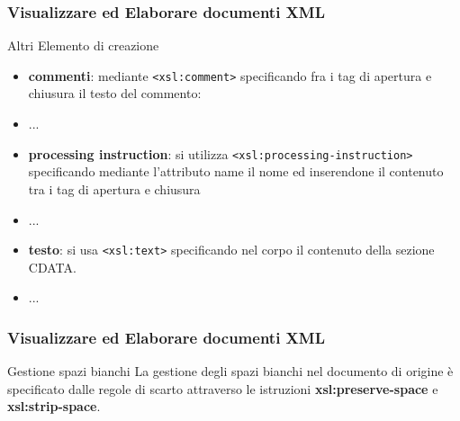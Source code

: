 \begin{frame}
    \frametitle{Visualizzare ed Elaborare documenti XML}
    \addtocounter{nframe}{1}
    

     \begin{block}{Altri Elemento di creazione}
        \begin{itemize}
            \item \textbf{commenti}: mediante \texttt{<xsl:comment>} specificando fra i tag di apertura e chiusura il testo del commento:
            \item[] ...
            \item \textbf{processing instruction}: si utilizza \texttt{<xsl:processing-instruction>} specificando mediante l’attributo name il nome ed inserendone il contenuto tra i tag di apertura e chiusura
            \item[] ...
            \item \textbf{testo}: si usa \texttt{<xsl:text>} specificando nel corpo il contenuto della sezione CDATA.
            \item[] ...  
        \end{itemize}
     \end{block}

\end{frame}

\begin{frame}
    \frametitle{Visualizzare ed Elaborare documenti XML}
    \addtocounter{nframe}{1}
    

     \begin{block}{Gestione spazi bianchi}
        La gestione degli spazi bianchi nel documento di origine è specificato dalle regole di scarto attraverso le istruzioni \textbf{xsl:preserve-space} e \textbf{xsl:strip-space}.
     \end{block}

\end{frame}


